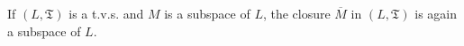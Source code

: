 If $(L, \mathfrak{T})$ is a t.v.s. and $M$ is a subspace of $L$, the closure $\overline{M}$ in $(L, \mathfrak{T})$ is again a subspace of $L$.
